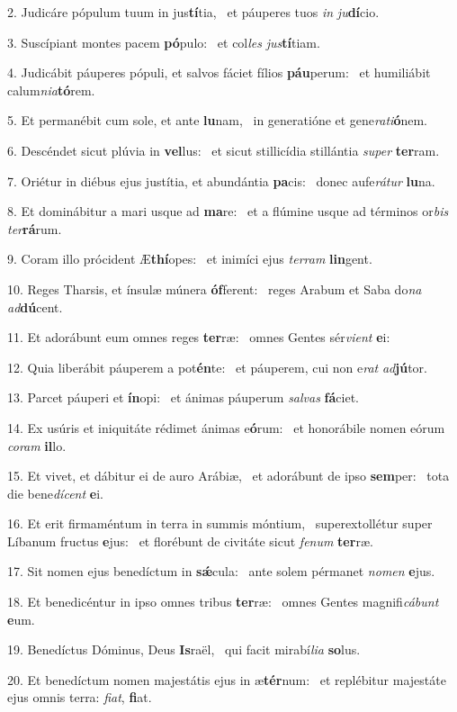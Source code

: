 2. Judicáre pópulum tuum in jus\textbf{tí}tia, \ast\  et páuperes tuos \textit{in} \textit{ju}\textbf{dí}cio.\

3. Suscípiant montes pacem \textbf{pó}pulo: \ast\  et col\textit{les} \textit{jus}\textbf{tí}tiam.\

4. Judicábit páuperes pópuli, et salvos fáciet fílios \textbf{páu}perum: \ast\  et humiliábit calum\textit{ni}\textit{a}\textbf{tó}rem.\

5. Et permanébit cum sole, et ante \textbf{lu}nam, \ast\  in generatióne et gene\textit{ra}\textit{ti}\textbf{ó}nem.\

6. Descéndet sicut plúvia in \textbf{vel}lus: \ast\  et sicut stillicídia stillántia \textit{su}\textit{per} \textbf{ter}ram.\

7. Oriétur in diébus ejus justítia, et abundántia \textbf{pa}cis: \ast\  donec aufe\textit{rá}\textit{tur} \textbf{lu}na.\

8. Et dominábitur a mari usque ad \textbf{ma}re: \ast\  et a flúmine usque ad términos or\textit{bis} \textit{ter}\textbf{rá}rum.\

9. Coram illo prócident Æ\textbf{thí}opes: \ast\  et inimíci ejus \textit{ter}\textit{ram} \textbf{lin}gent.\

10. Reges Tharsis, et ínsulæ múnera \textbf{óf}ferent: \ast\  reges Arabum et Saba do\textit{na} \textit{ad}\textbf{dú}cent.\

11. Et adorábunt eum omnes reges \textbf{ter}ræ: \ast\  omnes Gentes sér\textit{vi}\textit{ent} \textbf{e}i:\

12. Quia liberábit páuperem a pot\textbf{én}te: \ast\  et páuperem, cui non e\textit{rat} \textit{ad}\textbf{jú}tor.\

13. Parcet páuperi et \textbf{ín}opi: \ast\  et ánimas páuperum \textit{sal}\textit{vas} \textbf{fá}ciet.\

14. Ex usúris et iniquitáte rédimet ánimas e\textbf{ó}rum: \ast\  et honorábile nomen eórum \textit{co}\textit{ram} \textbf{il}lo.\

15. Et vivet, et dábitur ei de auro Arábiæ, \dag\  et adorábunt de ipso \textbf{sem}per: \ast\  tota die bene\textit{dí}\textit{cent} \textbf{e}i.\

16. Et erit firmaméntum in terra in summis móntium, \dag\  superextollétur super Líbanum fructus \textbf{e}jus: \ast\  et florébunt de civitáte sicut \textit{fe}\textit{num} \textbf{ter}ræ.\

17. Sit nomen ejus benedíctum in \textbf{sǽ}cula: \ast\  ante solem pérmanet \textit{no}\textit{men} \textbf{e}jus.\

18. Et benedicéntur in ipso omnes tribus \textbf{ter}ræ: \ast\  omnes Gentes magnifi\textit{cá}\textit{bunt} \textbf{e}um.\

19. Benedíctus Dóminus, Deus \textbf{Is}raël, \ast\  qui facit mirabí\textit{li}\textit{a} \textbf{so}lus.\

20. Et benedíctum nomen majestátis ejus in æ\textbf{tér}num: \ast\  et replébitur majestáte ejus omnis terra: \textit{fi}\textit{at}, \textbf{fi}at.\


